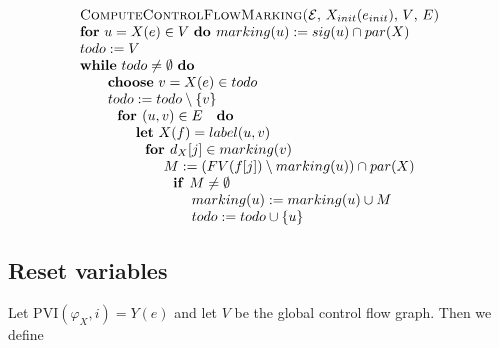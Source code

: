 \begin{equation*}
\begin{tabular}{l}
\textsc{ComputeControlFlowMarking(}$\mathcal{E}$, $X_{init}(e_{init})$, $V$, 
$E$\textsc{)} \\ 
\textbf{for} $u=X(e)\in V$ \textbf{do }$marking(u):=sig(u)\cap par(X)$ \\ 
$todo:=V$ \\ 
\textbf{while} $todo\neq \emptyset $ \textbf{do} \\ 
$\qquad $\textbf{choose} $v=X(e)\in todo$ \\ 
$\qquad todo:=todo\setminus \{v\}$ \\ 
$\qquad \text{\textbf{for }}(u,v)\in E\text{ \textbf{do}}$ \\ 
$\qquad \qquad $\textbf{let} $X(f)=label(u,v)$ \\ 
$\qquad \qquad \text{\textbf{for }}d_{X}[j]\in marking(v)$ \\ 
$\qquad \qquad \qquad M:=(FV(f[j])\setminus marking(u))\cap par(X)$ \\ 
$\qquad \qquad \qquad \text{\textbf{if }}M\neq \emptyset $ \\ 
$\qquad \qquad \qquad \qquad marking(u):=marking(u)\cup M$ \\ 
$\qquad \qquad \qquad \qquad todo:=todo\cup \{u\}$%
\end{tabular}%
\end{equation*}

\newpage

\subsection{Reset variables}

Let $\mathrm{PVI}(\varphi _{X},i)=Y(e)$ and let $V$ be the global control
flow graph. Then we define


